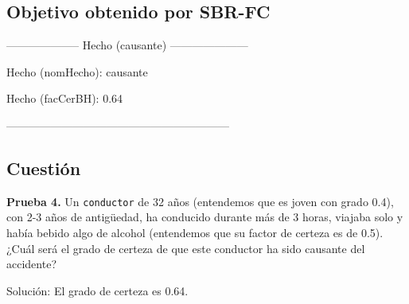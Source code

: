 \subsection{Objetivo obtenido por SBR-FC}
\begin{center}
\par -------------------- Hecho (causante) ---------------------
\par Hecho (nomHecho): causante
\par Hecho (facCerBH): 0.64
\par ------------------------------------------------------------
\end{center}
\subsection{Cuestión}
\begin{ejer}
	\textbf{Prueba 4.} Un \texttt{conductor} de 32 años (entendemos que es joven con grado 0.4), 
	con 2-3 años de antigüedad, ha conducido durante más de 3 horas, viajaba solo y 
	había bebido algo de alcohol (entendemos que su factor de certeza es de 0.5). \\
	¿Cuál será el grado de certeza de que este conductor ha sido causante del accidente?
\end{ejer}
\par Solución: El grado de certeza es 0.64.